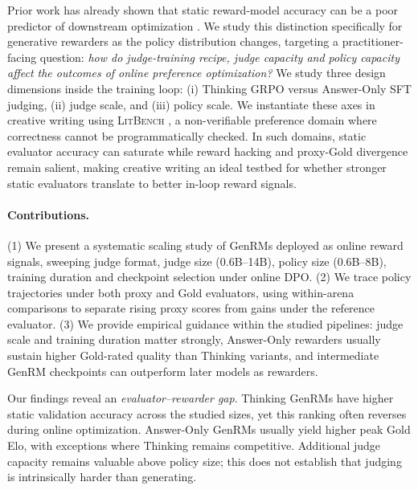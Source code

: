 \documentclass[11pt,letterpaper]{article}
\begin{document}
Prior work has already shown that static reward-model accuracy can be a poor predictor of downstream optimization \citep{wen2025rethinking,frick2024evaluate,kim2025rethinking}. We study this distinction specifically for generative rewarders as the policy distribution changes, targeting a practitioner-facing question:
\emph{how do judge-training recipe, judge capacity and policy capacity affect the outcomes of online preference optimization?} We study three design dimensions inside the training loop: (i) Thinking GRPO versus Answer-Only SFT judging, (ii) judge scale, and (iii) policy scale.
We instantiate these axes in creative writing using \textsc{LitBench} \citep{fein2025litbench}, a non-verifiable preference domain where correctness cannot be programmatically checked. In such domains, static evaluator accuracy can saturate while reward hacking and proxy-Gold divergence remain salient, making creative writing an ideal testbed for whether stronger static evaluators translate to better in-loop reward signals.

\paragraph{Contributions.}
(1) We present a systematic scaling study of GenRMs deployed as online reward signals, sweeping judge format, judge size (0.6B--14B), policy size (0.6B--8B), training duration and checkpoint selection under online DPO.
(2) We trace policy trajectories under both proxy and Gold evaluators, using within-arena comparisons to separate rising proxy scores from gains under the reference evaluator.
(3) We provide empirical guidance within the studied pipelines: judge scale and training duration matter strongly, Answer-Only rewarders usually sustain higher Gold-rated quality than Thinking variants, and intermediate GenRM checkpoints can outperform later models as rewarders.

Our findings reveal an \emph{evaluator--rewarder gap}. Thinking GenRMs have higher static validation accuracy across the studied sizes, yet this ranking often reverses during online optimization. Answer-Only GenRMs usually yield higher peak Gold Elo, with exceptions where Thinking remains competitive. Additional judge capacity remains valuable above policy size; this does not establish that judging is intrinsically harder than generating.
\end{document}
